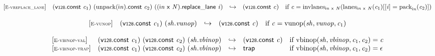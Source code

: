 \vspace{1ex}

$$
\begin{array}{@{}l@{}lcl@{}l@{}}
{[\textsc{\scriptsize E{-}vreplace\_lane}]} \quad & (\mathsf{v{\scriptstyle128}}.\mathsf{const}~{\mathit{c}}_{{1}})~({\mathrm{unpack}}({\mathsf{i}}{{\mathit{n}}}).\mathsf{const}~{\mathit{c}}_{{2}})~(({\mathsf{i}}{{\mathit{n}}}~\mathsf{x}~{\mathit{N}}).\mathsf{replace\_lane}~{\mathit{i}}) &\hookrightarrow& (\mathsf{v{\scriptstyle128}}.\mathsf{const}~{\mathit{c}}) &\quad
  \mbox{if}~{\mathit{c}} = {{\mathrm{invlanes}}}_{{\mathsf{i}}{{\mathit{n}}}~\mathsf{x}~{\mathit{N}}}({{\mathrm{lanes}}}_{{\mathsf{i}}{{\mathit{n}}}~\mathsf{x}~{\mathit{N}}}({\mathit{c}}_{{1}}){}[{}[{\mathit{i}}] = {{\mathrm{pack}}}_{{\mathsf{i}}{{\mathit{n}}}}({\mathit{c}}_{{2}})]) \\
\end{array}
$$

\vspace{1ex}

$$
\begin{array}{@{}l@{}lcl@{}l@{}}
{[\textsc{\scriptsize E{-}vunop}]} \quad & (\mathsf{v{\scriptstyle128}}.\mathsf{const}~{\mathit{c}}_{{1}})~({\mathit{sh}} . {\mathit{vunop}}) &\hookrightarrow& (\mathsf{v{\scriptstyle128}}.\mathsf{const}~{\mathit{c}}) &\quad
  \mbox{if}~{\mathit{c}} = {\mathrm{vunop}}({\mathit{sh}}, {\mathit{vunop}}, {\mathit{c}}_{{1}}) \\
\end{array}
$$

\vspace{1ex}

$$
\begin{array}{@{}l@{}lcl@{}l@{}}
{[\textsc{\scriptsize E{-}vbinop{-}val}]} \quad & (\mathsf{v{\scriptstyle128}}.\mathsf{const}~{\mathit{c}}_{{1}})~(\mathsf{v{\scriptstyle128}}.\mathsf{const}~{\mathit{c}}_{{2}})~({\mathit{sh}} . {\mathit{vbinop}}) &\hookrightarrow& (\mathsf{v{\scriptstyle128}}.\mathsf{const}~{\mathit{c}}) &\quad
  \mbox{if}~{\mathrm{vbinop}}({\mathit{sh}}, {\mathit{vbinop}}, {\mathit{c}}_{{1}}, {\mathit{c}}_{{2}}) = {\mathit{c}} \\
{[\textsc{\scriptsize E{-}vbinop{-}trap}]} \quad & (\mathsf{v{\scriptstyle128}}.\mathsf{const}~{\mathit{c}}_{{1}})~(\mathsf{v{\scriptstyle128}}.\mathsf{const}~{\mathit{c}}_{{2}})~({\mathit{sh}} . {\mathit{vbinop}}) &\hookrightarrow& \mathsf{trap} &\quad
  \mbox{if}~{\mathrm{vbinop}}({\mathit{sh}}, {\mathit{vbinop}}, {\mathit{c}}_{{1}}, {\mathit{c}}_{{2}}) = \epsilon \\
\end{array}
$$

